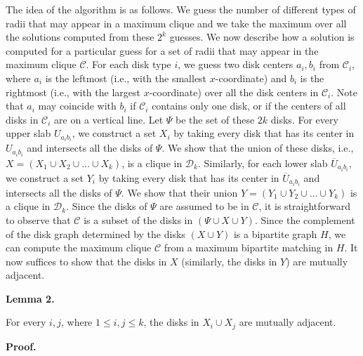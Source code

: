 \documentclass[10pt,a4paper]{amsart}
\begin{document}
\par
\par
The idea of the algorithm is as follows. We guess the number of different types of radii that may appear in a maximum clique and we take the maximum over all the solutions computed from these $2^{k}$ guesses. We now describe how a solution is computed for a particular guess for a set of radii that may appear in the maximum clique $\mathcal{C}$. For each disk type $i$, we guess two disk centers $a_{i},b_{i}$ from $\mathcal{C}_{i}$, where $a_{i}$ is the leftmost (i.e., with the smallest $x$-coordinate) and $b_{i}$ is the rightmost (i.e., with the largest $x$-coordinate) over all the disk centers in $\mathcal{C}_{i}$. Note that $a_{i}$ may coincide with $b_{i}$ if $\mathcal{C}_{i}$ contains only one disk, or if the centers of all disks in $\mathcal{C}_{i}$ are on a vertical line. Let $\Psi$ be the set of these $2k$ disks. For every upper slab $U_{a_{i}b_{i}}$, we construct a set $X_{i}$ by taking every disk that has its center in $U_{a_{i}b_{i}}$ and intersects all the disks of $\Psi$. We show that the union of these disks, i.e., $X=(X_{1}\cup X_{2}\cup\ldots\cup X_{k})$, is a clique in $\mathcal{D}_{k}$. Similarly, for each lower slab $\overline{U}_{a_{i}b_{i}}$, we construct a set $Y_{i}$ by taking every disk that has its center in $\overline{U}_{a_{i}b_{i}}$ and intersects all the disks of $\Psi$. We show that their union $Y=(Y_{1}\cup Y_{2}\cup\ldots\cup Y_{k})$ is a clique in $\mathcal{D}_{k}$. Since the disks of $\Psi$ are assumed to be in $\mathcal{C}$, it is straightforward to observe that $\mathcal{C}$ is a subset of the disks in $(\Psi\cup X\cup Y)$. Since the complement of the disk graph determined by the disks $(X\cup Y)$ is a bipartite graph $H$, we can compute the maximum clique $\mathcal{C}$ from a maximum bipartite matching in $H$. It now suffices to show that the disks in $X$ (similarly, the disks in $Y$) are mutually adjacent.
\par
\par
\par\medskip\noindent\textbf{Lemma 2.}\par
For every $i,j$, where $1\leq i,j\leq k$, the disks in $X_{i}\cup X_{j}$ are mutually adjacent.
\par
\par
\par
\par\medskip\noindent\textbf{Proof.}\par
\end{document}
